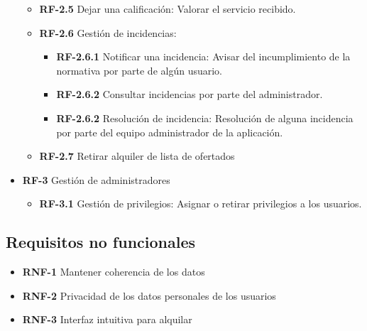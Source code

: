 \documentclass[11pt,spanish]{article} %
\begin{document}
\begin{itemize}
\begin{itemize}
\begin{itemize}
		\end{itemize}
		\item \textbf{RF-2.5} Dejar una calificación: Valorar el servicio recibido.
		\item \textbf{RF-2.6} Gestión de incidencias: 
		\begin{itemize}
			\item \textbf{RF-2.6.1} Notificar una incidencia: Avisar del incumplimiento de la normativa por parte de algún usuario.
			\item \textbf{RF-2.6.2} Consultar incidencias por parte del administrador.
			\item \textbf{RF-2.6.2} Resolución de incidencia: Resolución de alguna incidencia por parte del equipo administrador de la aplicación.	
		\end{itemize}
		\item \textbf{RF-2.7} Retirar alquiler de lista de ofertados
	\end{itemize}

	\hspace{0.25cm}
	\item \textbf{RF-3} Gestión de administradores
	\begin{itemize}
		\item \textbf{RF-3.1} Gestión de privilegios: Asignar o retirar privilegios a los usuarios.
	\end{itemize}
\end{itemize}

\subsection{Requisitos no funcionales}
\begin{itemize}
	\item \textbf{RNF-1} Mantener coherencia de los datos
	\item \textbf{RNF-2} Privacidad de los datos personales de los usuarios
	\item \textbf{RNF-3} Interfaz intuitiva para alquilar	
\end{itemize}
\end{document}
